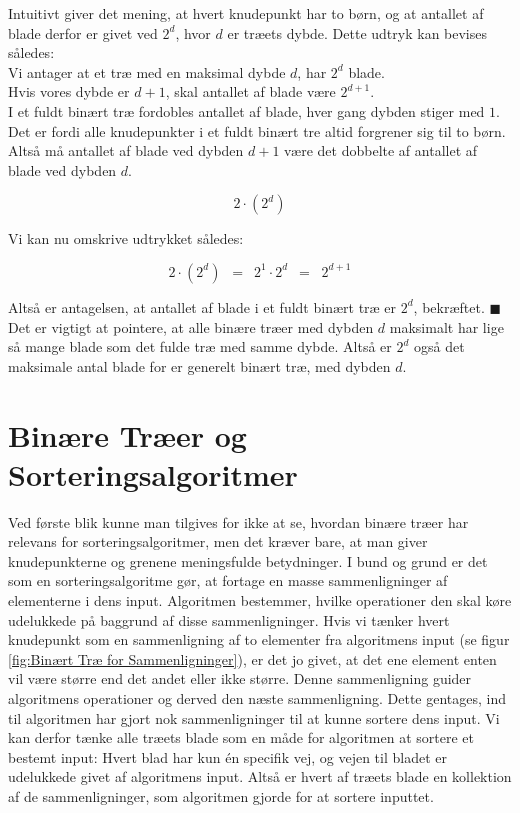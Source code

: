 Intuitivt giver det mening, at hvert knudepunkt har to børn, og at antallet af blade derfor er givet ved $2^d$, hvor $d$ er træets dybde. Dette udtryk kan bevises således:\\

Vi antager at et træ med en maksimal dybde $d$, har $2^d$ blade.\\

Hvis vores dybde er $d + 1$, skal antallet af blade være $2^{d+1}$.\\

I et fuldt binært træ fordobles antallet af blade, hver gang dybden stiger med $1$. Det er fordi alle knudepunkter i et fuldt binært tre altid forgrener sig til to børn. Altså må antallet af blade ved dybden $d+1$ være det dobbelte af antallet af blade ved dybden $d$.

$$2\cdot (2^d)$$

Vi kan nu omskrive udtrykket således:

$$2\cdot (2^d) \,\,\,=\,\,\, 2^1 \cdot 2^d \,\,\,=\,\,\ 2^{d+1}$$

Altså er antagelsen, at antallet af blade i et fuldt binært træ er $2^d$, bekræftet. $\blacksquare$\\

Det er vigtigt at pointere, at alle binære træer med dybden $d$ maksimalt har lige så mange blade som det fulde træ med samme dybde. Altså er $2^d$ også det maksimale antal blade for er generelt binært træ, med dybden $d$.



\section{Binære Træer og Sorteringsalgoritmer}
\label{sec:Binære Træer og Sorteringsalgoritmer}

Ved første blik kunne man tilgives for ikke at se, hvordan binære træer har relevans for sorteringsalgoritmer, men det kræver bare, at man giver knudepunkterne og grenene meningsfulde betydninger. I bund og grund er det som en sorteringsalgoritme gør, at fortage en masse sammenligninger af elementerne i dens input. Algoritmen bestemmer, hvilke operationer den skal køre udelukkede på baggrund af disse sammenligninger. Hvis vi tænker hvert knudepunkt som en sammenligning af to elementer fra algoritmens input (se figur \ref{fig:Binært Træ for Sammenligninger}), er det jo givet, at det ene element enten vil være større end det andet eller ikke større. Denne sammenligning guider algoritmens operationer og derved den næste sammenligning. Dette gentages, ind til algoritmen har gjort nok sammenligninger til at kunne sortere dens input. Vi kan derfor tænke alle træets blade som en måde for algoritmen at sortere et bestemt input: Hvert blad har kun én specifik vej, og vejen til bladet er udelukkede givet af algoritmens input. Altså er hvert af træets blade en kollektion af de sammenligninger, som algoritmen gjorde for at sortere inputtet. \cite[s. 109]{aogd}

